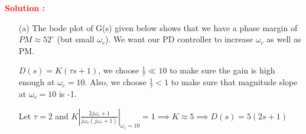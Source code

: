 \documentclass[12pt]{article}
\begin{document}
\textbf{\textcolor{red}{Solution :}} \\
\begin{itemize}
    \item [(a)] The bode plot of G(s) given below shows that we have a phase margin of  $PM \approx 52^\circ$ (but small $\omega_c$). We want our PD controller to increase $\omega_c$ as well as PM.

    $D(s) = K(\tau s + 1)$, we choose $\frac{1}{\tau}  \ll 10$ to make sure the gain is high enough at $\omega_c = 10$. Also, we choose $\frac{1}{\tau} < 1$ to make sure that magnitude slope at $\omega_c = 10$ is -1.

    Let $\tau=2$ and $K\left| \frac{2 j \omega_c +1}{j \omega_c (j \omega_c+1)}\right|_{\omega_c = 10} =1 \implies  K \approx 5 \implies D(s) = 5(2 s + 1)$


\end{itemize}
\end{document}
